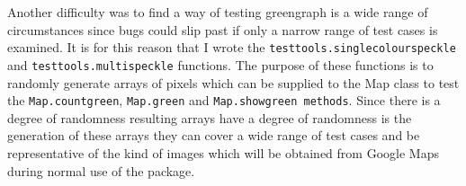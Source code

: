 \documentclass{article}
\begin{document}
Another difficulty was to find a way of testing greengraph is a wide range of circumstances since bugs could slip past if only a narrow range of test cases is examined. It is for this reason that I wrote the \texttt{test\textunderscore tools.single\textunderscore colour\textunderscore speckle} and \texttt{test\textunderscore tools.multi\textunderscore speckle} functions. The purpose of these functions is to randomly generate arrays of pixels which can be supplied to the Map class to test the \texttt{Map.count\textunderscore green}, \texttt{Map.green} and \texttt{Map.show\textunderscore green methods}. Since there is a degree of randomness resulting arrays have a degree of randomness is the generation of these arrays they can cover a wide range of test cases and be representative of the kind of images which will be obtained from Google Maps during normal use of the package.
\end{document}
